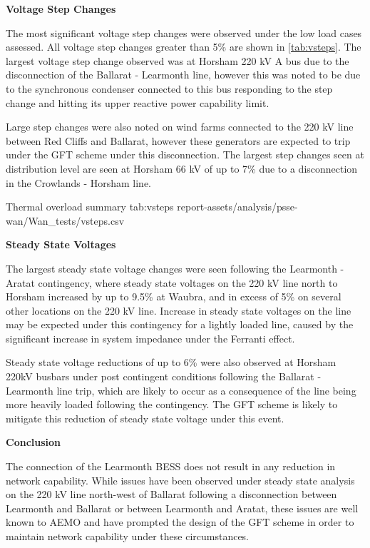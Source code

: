 \documentclass{../grid-link-report}
\begin{document}
	\textbf{Voltage Step Changes}
	
	The most significant voltage step changes were observed under the low load cases assessed. All voltage step changes greater than 5\% are shown in \ref{tab:vsteps}. The largest voltage step change observed was at Horsham 220 kV A bus due to the disconnection of the Ballarat - Learmonth line, however this was noted to be due to the synchronous condenser connected to this bus responding to the step change and hitting its upper reactive power capability limit.
	
	Large step changes were also noted on wind farms connected to the 220 kV line between Red Cliffs and Ballarat, however these generators are expected to trip under the GFT scheme under this disconnection. The largest step changes seen at distribution level are seen at Horsham 66 kV of up to 7\% due to a disconnection in the Crowlands - Horsham line. 
	
	{
		\fontsize{9}{13}\selectfont
		\autoscaledlongtable
		{Thermal overload summary}
		{tab:vsteps}
		{report-assets/analysis/psse-wan/Wan_tests/vsteps.csv}
	}
	
	\textbf{Steady State Voltages}
	
	The largest steady state voltage changes were seen following the Learmonth - Aratat contingency, where steady state voltages on the 220 kV line north to Horsham increased by up to 9.5\% at Waubra, and in excess of 5\% on several other locations on the 220 kV line. Increase in steady state voltages on the line may be expected under this contingency for a lightly loaded line, caused by the significant increase in system impedance under the Ferranti effect.
	
	Steady state voltage reductions of up to 6\% were also observed at Horsham 220kV busbars under post contingent conditions following the Ballarat - Learmonth line trip, which are likely to occur as a consequence of the line being more heavily loaded following the contingency. The GFT scheme is likely to mitigate this reduction of steady state voltage under this event.
	
	\textbf{Conclusion}
	
	The connection of the Learmonth BESS does not result in any reduction in network capability. While issues have been observed under steady state analysis on the 220 kV line north-west of Ballarat following a disconnection between Learmonth and Ballarat or between Learmonth and Aratat, these issues are well known to AEMO and have prompted the design of the GFT scheme in order to maintain network capability under these circumstances.
\end{document}
